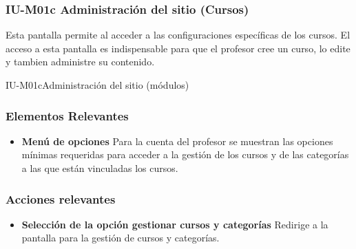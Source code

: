 
\subsubsection{IU-M01c Administración del sitio (Cursos)}

 Esta pantalla permite al  acceder a las configuraciones
 específicas de los cursos. El acceso a esta pantalla es indispensable para que el 
 profesor cree un curso, lo edite y tambien administre su contenido.

        {IU-M01c}{Administración del sitio (módulos)}

\subsubsection{Elementos Relevantes}

    \begin{itemize}
    \item {\bf Menú de opciones}
        Para la cuenta del profesor se muestran las opciones mínimas requeridas
        para acceder a la gestión de los cursos y de las categorías a las que
        están vinculadas los cursos.
    \end{itemize}

\subsubsection{Acciones relevantes}

    \begin{itemize}
    \item {\bf Selección de la opción gestionar cursos y categorías}
        Redirige a la pantalla para la gestión de cursos y categorías.
    \end{itemize}

\clearpage
